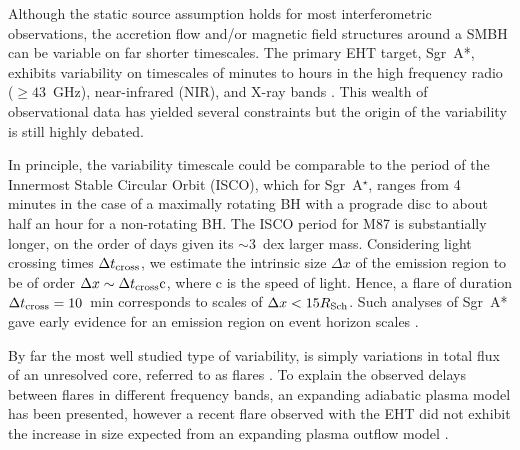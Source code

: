 Although the static source assumption holds for most interferometric observations, the accretion flow and/or magnetic field structures around a SMBH can be variable on far shorter timescales. The primary EHT target, Sgr~A*,  exhibits variability on timescales of minutes to hours in the high frequency radio ($\ge 43$~GHz), near-infrared (NIR), and X-ray bands \citep[e.g.][]{Baganoff_2001, Genzel_2003, Yusef-Zadeh_2006,Marrone_2006, Fish_2011, Johnson_2015b}. This wealth of observational data has yielded several constraints but the origin of the variability is still highly debated.


In principle, the variability timescale could be comparable to the period of the Innermost Stable Circular Orbit (ISCO), which for Sgr~A$^\star$, ranges from 4 minutes in the case of a maximally rotating BH with a prograde disc to about half an hour for a non-rotating BH. The ISCO period for M87 is substantially longer, on the order of days given its $\sim3$~dex larger mass. Considering light crossing times $\Delta t_{\rm cross}$, we estimate the intrinsic size $\Delta x$ of the emission region to be of order $\Delta x \sim \Delta t_{\rm cross} \rm c$, where c is the speed of light. Hence, a flare of duration $ \Delta t_{\rm cross} =10$~min corresponds to scales of  $\Delta x < 15 R_{\rm Sch}$. Such analyses of Sgr~A* gave early evidence for an emission region on event horizon scales \citep{Doeleman_2009b}.


By far the most well studied type of variability, is simply variations in total flux of an unresolved core, referred to as flares \citep[e.g.][]{Baganoff_2001, Genzel_2003, Yusef-Zadeh_2006,Marrone_2006}. To explain the observed delays between flares in different frequency bands, an expanding adiabatic plasma model \citep[e.g.][]{Marrone_2008} has been presented, however a recent flare observed with the EHT did not exhibit the increase in size expected from an expanding plasma outflow model \citep{Fish_2011}.

